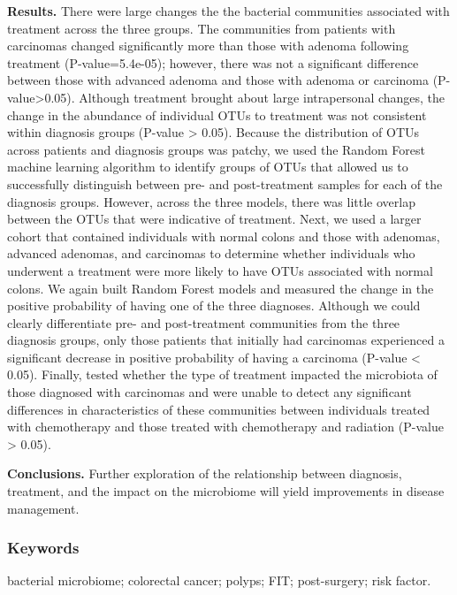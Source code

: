 \documentclass[12pt,]{article}
\begin{document}
\textbf{Results.} There were large changes the the bacterial communities
associated with treatment across the three groups. The communities from
patients with carcinomas changed significantly more than those with
adenoma following treatment (P-value=5.4e-05); however, there was not a
significant difference between those with advanced adenoma and those
with adenoma or carcinoma (P-value\textgreater{}0.05). Although
treatment brought about large intrapersonal changes, the change in the
abundance of individual OTUs to treatment was not consistent within
diagnosis groups (P-value \textgreater{} 0.05). Because the distribution
of OTUs across patients and diagnosis groups was patchy, we used the
Random Forest machine learning algorithm to identify groups of OTUs that
allowed us to successfully distinguish between pre- and post-treatment
samples for each of the diagnosis groups. However, across the three
models, there was little overlap between the OTUs that were indicative
of treatment. Next, we used a larger cohort that contained individuals
with normal colons and those with adenomas, advanced adenomas, and
carcinomas to determine whether individuals who underwent a treatment
were more likely to have OTUs associated with normal colons. We again
built Random Forest models and measured the change in the positive
probability of having one of the three diagnoses. Although we could
clearly differentiate pre- and post-treatment communities from the three
diagnosis groups, only those patients that initially had carcinomas
experienced a significant decrease in positive probability of having a
carcinoma (P-value \textless{} 0.05). Finally, tested whether the type
of treatment impacted the microbiota of those diagnosed with carcinomas
and were unable to detect any significant differences in characteristics
of these communities between individuals treated with chemotherapy and
those treated with chemotherapy and radiation (P-value \textgreater{}
0.05).

\textbf{Conclusions.} Further exploration of the relationship between
diagnosis, treatment, and the impact on the microbiome will yield
improvements in disease management.

\newpage

\subsubsection{Keywords}\label{keywords}

bacterial microbiome; colorectal cancer; polyps; FIT; post-surgery; risk
factor.
\end{document}
